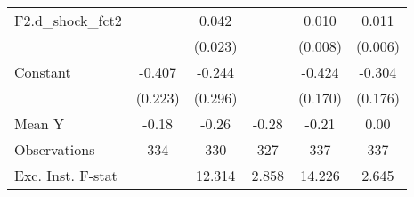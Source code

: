 {\begin{tabular}{l*{5}{c}}
\addlinespace
F2.d\_shock\_fct2     &                     &       0.042\sym{*}  &                     &       0.010         &       0.011\sym{*}  \\
                    &                     &     (0.023)         &                     &     (0.008)         &     (0.006)         \\
\addlinespace
Constant            &      -0.407\sym{*}  &      -0.244         &                     &      -0.424\sym{**} &      -0.304\sym{*}  \\
                    &     (0.223)         &     (0.296)         &                     &     (0.170)         &     (0.176)         \\
\midrule
Mean Y              &       -0.18         &       -0.26         &       -0.28         &       -0.21         &        0.00         \\
Observations        &         334         &         330         &         327         &         337         &         337         \\
Exc. Inst. F-stat   &                     &      12.314         &       2.858         &      14.226         &       2.645         \\
\bottomrule
\end{tabular}
}
